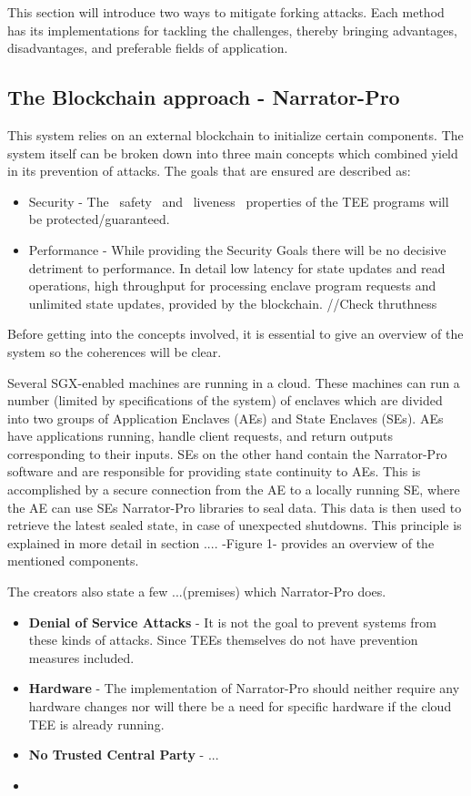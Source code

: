  
 This section will introduce two ways to mitigate forking attacks. Each method has its implementations for tackling the challenges, thereby bringing advantages, disadvantages, and preferable fields of application.

\subsection{The Blockchain approach - Narrator-Pro}

This system relies on an external blockchain to initialize certain components. The system itself can be broken down into three main concepts which combined yield in its prevention of attacks. The goals that are ensured are described as:
\begin{itemize}
     \item Security - The ~safety~ and ~liveness~ properties of the TEE programs will be protected/guaranteed.
     \item Performance - While providing the Security Goals there will be no decisive detriment to performance. In detail low latency for state updates and read operations, high throughput for processing enclave program requests and unlimited state updates, provided by the blockchain. //Check thruthness
\end{itemize} 
Before getting into the concepts involved, it is essential to give an overview of the system so the coherences will be clear.

Several SGX-enabled machines are running in a cloud. These machines can run a number (limited by specifications of the system) of enclaves which are divided into two groups of Application Enclaves (AEs) and State Enclaves (SEs). AEs have applications running, handle client requests, and return outputs corresponding to their inputs. SEs on the other hand contain the Narrator-Pro software and are responsible for providing state continuity to AEs. This is accomplished by a secure connection from the AE to a locally running SE, where the AE can use SEs Narrator-Pro libraries to seal data. This data is then used to retrieve the latest sealed state, in case of unexpected shutdowns. This principle is explained in more detail in section .... -Figure 1- provides an overview of the mentioned components.

The creators also state a few ...(premises) which Narrator-Pro does. 
\begin{itemize}
    \item \textbf{Denial of Service Attacks} - It is not the goal to prevent systems from these kinds of attacks. Since TEEs themselves do not have prevention measures included.  
    \item \textbf{Hardware} - The implementation of Narrator-Pro should neither require any hardware changes nor will there be a need for specific hardware if the cloud TEE is already running.  
    \item \textbf{No Trusted Central Party} - ... 
    \item \textbf{}
\end{itemize} 

